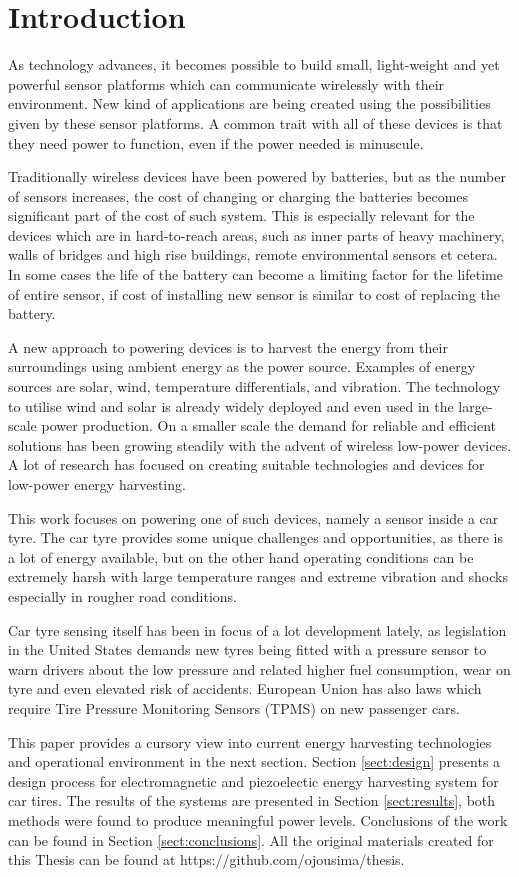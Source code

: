 \section{Introduction}

\thispagestyle{empty}

As technology advances, it becomes possible to build small, light-weight and yet powerful sensor platforms which can communicate wirelessly with their environment. New kind of applications are being created using the possibilities given by these sensor platforms. A common trait with all of these devices is that they need power to function, even if the power needed is minuscule. 

Traditionally wireless devices have been powered by batteries, but as the number of sensors increases, the cost of changing or charging the batteries becomes significant part of the cost of such system. This is especially relevant for the devices which are in hard-to-reach areas, such as inner parts of heavy machinery, walls of bridges and high rise buildings, remote environmental sensors et cetera. In some cases the life of the battery can become a limiting factor for the lifetime of entire sensor, if cost of installing new sensor is similar to cost of replacing the battery.

A new approach to powering devices is to harvest the energy from their surroundings using ambient energy as the power source. Examples of energy sources are solar, wind, temperature differentials, and vibration. The technology to utilise wind and solar is already widely deployed and even used in the large-scale power production. On a smaller scale the demand for reliable and efficient solutions has been growing steadily with the advent of wireless low-power devices. A lot of research has focused on creating suitable technologies and devices for low-power energy harvesting. 

This work focuses on powering one of such devices, namely a sensor inside a car tyre. The car tyre provides some unique challenges and opportunities, as there is a lot of energy available, but on the other hand operating conditions can be extremely harsh with large temperature ranges and extreme vibration and shocks especially in rougher road conditions.

Car tyre sensing itself has been in focus of a lot development lately, as legislation in the United States demands new tyres being fitted with a pressure sensor to warn drivers about the low pressure and related higher fuel consumption, wear on tyre and even elevated risk of accidents. European Union has also laws which require Tire Pressure Monitoring Sensors (TPMS) on new passenger cars. 

This paper provides a cursory view into current energy harvesting technologies and operational environment in the next section. Section \ref{sect:design} presents a design process for electromagnetic and piezoelectic energy harvesting system for car tires. The results of the systems are presented in Section \ref{sect:results}, both methods were found to produce meaningful power levels. Conclusions of the work can be found in Section \ref{sect:conclusions}. All the original materials created for this Thesis can be found at https://github.com/ojousima/thesis. 
